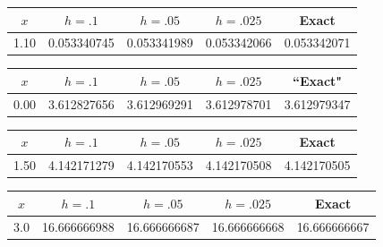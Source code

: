 {\small
\begin{tabular}{|r|r|r|r|r|}
\hline
\multicolumn{1}{|c|}{$x$}&
\multicolumn{1}{|c|}{$h=.1$}&
\multicolumn{1}{|c|}{$h=.05$}&
\multicolumn{1}{|c|}{$h=.025$}&
\multicolumn{1}{|c|}{Exact}\\ \hline
1.10  & 0.053340745 & 0.053341989 & 0.053342066 & 0.053342071 \\
\hline
\end{tabular}}\bigskip

{\small
\begin{tabular}{|r|r|r|r|r|}
\hline
\multicolumn{1}{|c|}{$x$}&
\multicolumn{1}{|c|}{$h=.1$}&
\multicolumn{1}{|c|}{$h=.05$}&
\multicolumn{1}{|c|}{$h=.025$}&
\multicolumn{1}{|c|}{``Exact"}\\ \hline
0.00  & 3.612827656 & 3.612969291 & 3.612978701 & 3.612979347 \\
\hline
\end{tabular}}\bigskip

{\small
\begin{tabular}{|r|r|r|r|r|}
\hline
\multicolumn{1}{|c|}{$x$}&
\multicolumn{1}{|c|}{$h=.1$}&
\multicolumn{1}{|c|}{$h=.05$}&
\multicolumn{1}{|c|}{$h=.025$}&
\multicolumn{1}{|c|}{Exact}\\ \hline
 1.50  &   4.142171279 &  4.142170553 &   4.142170508 &  4.142170505 \\
\hline
\end{tabular}}\bigskip

{\small
\begin{tabular}{|r|r|r|r|r|}
\hline
\multicolumn{1}{|c|}{$x$}&
\multicolumn{1}{|c|}{$h=.1$}&
\multicolumn{1}{|c|}{$h=.05$}&
\multicolumn{1}{|c|}{$h=.025$}&
\multicolumn{1}{|c|}{Exact}\\ \hline
 3.0 &  16.666666988 & 16.666666687 & 16.666666668 &  16.666666667 \\
\hline
\end{tabular}}

\bigskip

